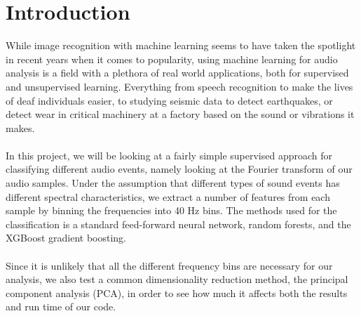 \documentclass[a4paper]{article}
\begin{document}
\section{Introduction}
While image recognition with machine learning seems to have taken the spotlight in recent years when it comes to popularity, using machine learning for audio analysis is a field with a plethora of real world applications, both for supervised and unsupervised learning. Everything from speech recognition to make the lives of deaf individuals easier, to studying seismic data to detect earthquakes, or detect wear in critical machinery at a factory based on the sound or vibrations it makes.
%
\\\\
In this project, we will be looking at a fairly simple supervised approach for classifying different audio events, namely looking at the Fourier transform of our audio samples. Under the assumption that different types of sound events has different spectral characteristics, we extract a number of features from each sample by binning the frequencies into 40 Hz bins. The methods used for the classification is a standard feed-forward neural network, random forests, and the XGBoost gradient boosting.
\\\\
Since it is unlikely that all the different frequency bins are necessary for our analysis, we also test a common dimensionality reduction method, the principal component analysis (PCA), in order to see how much it affects both the results and run time of our code.
%
\end{document}
